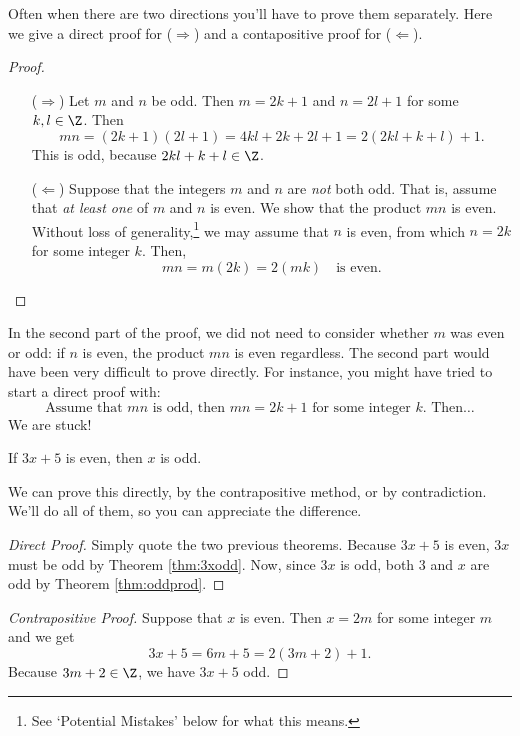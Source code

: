 \noindent Often when there are two directions you'll have to prove them separately. Here we give a direct proof for ($\Rightarrow$) and a contapositive proof for ($\Leftarrow$).

\begin{proof}
\begin{enumerate}
  \item[($\Rightarrow$)] Let $m$ and $n$ be odd. Then $m=2k+1$ and $n=2l+1$ for some $k,l\in\Z$. Then
  \[mn=(2k+1)(2l+1)=4kl+2k+2l+1=2(2kl+k+l)+1.\]
  This is odd, because $2kl+k+l\in\Z$.
  \item[($\Leftarrow$)] Suppose that the integers $m$ and $n$ are \emph{not} both odd. That is, assume that \emph{at least one} of $m$ and $n$ is even. We show that the product $mn$ is even. Without loss of generality,\footnote{See `Potential Mistakes' below for what this means.} we may assume that $n$ is even, from which $n=2k$ for some integer $k$. Then,
  \[mn=m(2k)=2(mk)\quad\text{is even}.\tag*{\qedhere}\]
\end{enumerate}
\end{proof}

\noindent In the second part of the proof, we did not need to consider whether $m$ was even or odd: if $n$ is even, the product $mn$ is even regardless. The second part would have been very difficult to prove directly. For instance, you might have tried to start a direct proof with:
\[\text{Assume that $mn$ is odd, then $mn=2k+1$ for some integer $k$. Then\ldots}\]
We are stuck!

\begin{thm}\label{thm: x odd if 3x+5 is odd}
If $3x+5$ is even, then $x$ is odd.
\end{thm}

We can prove this directly, by the contrapositive method, or by contradiction. We'll do all of them, so you can appreciate the difference. 

\begin{proof}[Direct Proof] Simply quote the two previous theorems. Because $3x+5$ is even, $3x$ must be odd by Theorem \ref{thm:3xodd}. Now, since   $3x$ is odd,  both $3$ and $x$ are odd by Theorem \ref{thm:oddprod}.
\end{proof}
 
\begin{proof}[Contrapositive Proof] Suppose that $x$ is even. Then $x=2m$ for some integer $m$ and we get
  \[3x+5=6m+5=2(3m+2)+1.\]
Because $3m+2\in\Z$, we have $3x+5$ odd. 
\end{proof}

